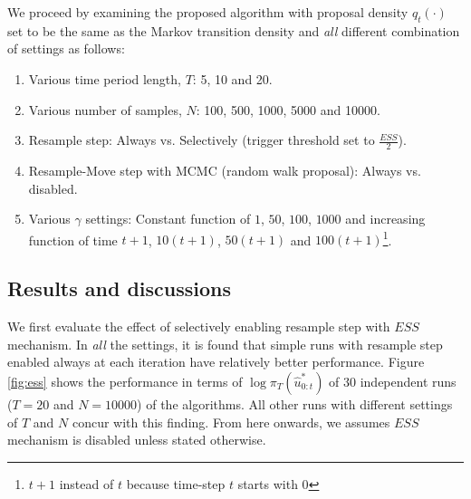 We proceed by examining the proposed algorithm with proposal density $q_t(\cdot)$ set to be the same as the Markov transition density and \emph{all} different combination of settings as follows:
\begin{enumerate}
\item Various time period length, $T$: 5, 10 and 20.
\item Various number of samples, $N$: 100, 500, 1000, 5000 and 10000.
\item Resample step: Always vs. Selectively (trigger threshold set to $\frac{ESS}{2}$).
\item Resample-Move step with MCMC (random walk proposal): Always vs. disabled.
\item Various $\gamma$ settings: Constant function of $1$, $50$, $100$, $1000$ and increasing function of time $t+1$, $10(t+1)$, $50(t+1)$ and $100(t+1)$\footnote{$t+1$ instead of $t$ because time-step $t$ starts with 0}. 
\end{enumerate}

\subsection{Results and discussions}
We first evaluate the effect of selectively enabling resample step with $ESS$ mechanism. In \emph{all} the settings, it is found that simple runs with resample step enabled always at each iteration have relatively better performance. Figure \ref{fig:ess} shows the performance in terms of $\log\pi_T(\hat{u}^*_{0:t})$ of 30 independent runs ($T=20$ and $N=10000$) of the algorithms. All other runs with different settings of $T$ and $N$ concur with this finding. From here onwards, we assumes $ESS$ mechanism is disabled unless stated otherwise.

